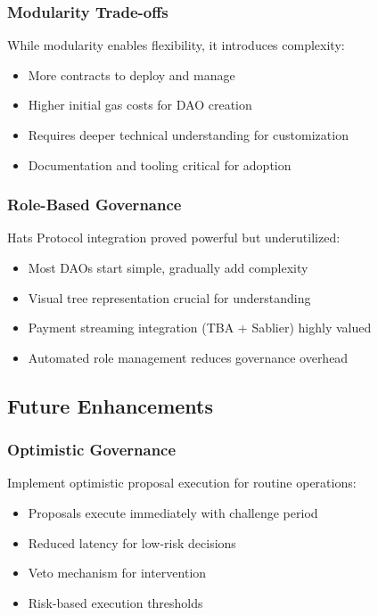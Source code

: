 \documentclass[11pt,a4paper]{article}
\begin{document}
\subsubsection{Modularity Trade-offs}

While modularity enables flexibility, it introduces complexity:
\begin{itemize}
    \item More contracts to deploy and manage
    \item Higher initial gas costs for DAO creation
    \item Requires deeper technical understanding for customization
    \item Documentation and tooling critical for adoption
\end{itemize}

\subsubsection{Role-Based Governance}

Hats Protocol integration proved powerful but underutilized:
\begin{itemize}
    \item Most DAOs start simple, gradually add complexity
    \item Visual tree representation crucial for understanding
    \item Payment streaming integration (TBA + Sablier) highly valued
    \item Automated role management reduces governance overhead
\end{itemize}

\subsection{Future Enhancements}

\subsubsection{Optimistic Governance}

Implement optimistic proposal execution for routine operations:
\begin{itemize}
    \item Proposals execute immediately with challenge period
    \item Reduced latency for low-risk decisions
    \item Veto mechanism for intervention
    \item Risk-based execution thresholds
\end{itemize}
\end{document}

